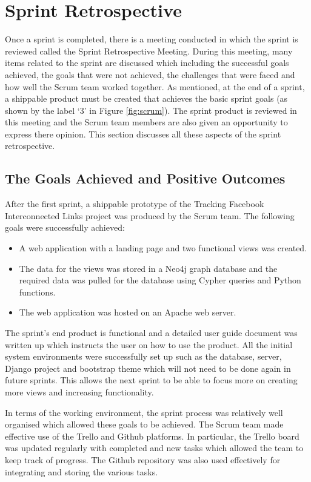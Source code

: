 \documentclass[12pt,onecolumn]{article}
\begin{document}
	\section{Sprint Retrospective} \label{retro}
	Once a sprint is completed, there is a meeting conducted in which the sprint is reviewed called the Sprint Retrospective Meeting. During this meeting, many items related to the sprint are discussed which including the successful goals achieved, the goals that were not achieved, the challenges that were faced and how well the Scrum team worked together. As mentioned, at the end of a sprint, a shippable product must be created that achieves the basic sprint goals (as shown by the label `3' in Figure \ref{fig:scrum}). The sprint product is reviewed in this meeting and the Scrum team members are also given an opportunity to express there opinion. This section discusses all these aspects of the sprint retrospective.
	
	\subsection{The Goals Achieved and Positive Outcomes}
	After the first sprint, a shippable prototype of the Tracking Facebook Interconnected Links project was produced by the Scrum team. The following goals were successfully achieved:
	
	\begin{itemize}
		\item A web application with a landing page and two functional views was created.
		\item The data for the views was stored in a Neo4j graph database and the required data was pulled for the database using Cypher queries and Python functions.
		\item The web application was hosted on an Apache web server.
	\end{itemize}
	
	The sprint's end product is functional and a detailed user guide document was written up which instructs the user on how to use the product. All the initial system environments were successfully set up such as the database, server, Django project and bootstrap theme which will not need to be done again in future sprints. This allows the next sprint to be able to focus more on creating more views and increasing functionality. 
	
	In terms of the working environment, the sprint process was relatively well organised which allowed these goals to be achieved. The Scrum team made effective use of the Trello and Github platforms. In particular, the Trello board was updated regularly with completed and new tasks which allowed the team to keep track of progress. The Github repository was also used effectively for integrating and storing the various tasks.
	
\end{document}
